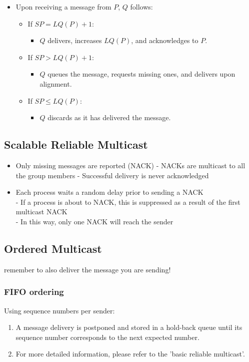 \begin{itemize}
    \item Upon receiving a message from \( P \), \( Q \) follows:
    \begin{itemize}
        \item If \( SP = LQ(P) + 1 \):
        \begin{itemize}
            \item \( Q \) delivers, increases \( LQ(P) \), and acknowledges to \( P \).
        \end{itemize}
        \item If \( SP > LQ(P) + 1 \):
        \begin{itemize}
            \item \( Q \) queues the message, requests missing ones, and delivers upon alignment.
        \end{itemize}
        \item If \( SP \leq LQ(P) \):
        \begin{itemize}
            \item \( Q \) discards as it has delivered the message.
        \end{itemize}
    \end{itemize}
\end{itemize}

\subsection{Scalable Reliable Multicast}
\begin{itemize}
    \item Only missing messages are reported (NACK)
- NACKs are multicast to all the group members
- Successful delivery is never acknowledged
\item Each process waits a random delay prior to sending a NACK \\
- If a process is about to NACK, this is suppressed as a result of the first multicast NACK \\
- In this way, only one NACK will reach the sender
\end{itemize}


\subsection{Ordered Multicast}
remember to also deliver the message you are sending!
\subsubsection{FIFO ordering}
Using sequence numbers per sender:
\begin{enumerate}

    \item A message delivery is postponed and stored in a hold-back queue until its sequence number corresponds to the next expected number.
    \item For more detailed information, please refer to the 'basic reliable multicast'.
\end{enumerate}
